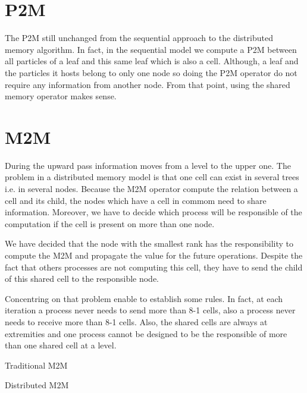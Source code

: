 \documentclass[10pt,letterpaper,titlepage]{report}
\begin{document}
\section{P2M}
The P2M still unchanged from the sequential approach to the distributed memory algorithm.
In fact, in the sequential model we compute a P2M between all particles of a leaf and this same leaf which is also a cell.
Although, a leaf and the particles it hosts belong to only one node so doing the P2M operator do not require any information from another node.
From that point, using the shared memory operator makes sense.


\section{M2M}
During the upward pass information moves from a level to the upper one.
The problem in a distributed memory model is that one cell can exist in several trees i.e. in several nodes.
Because the M2M operator compute the relation between a cell and its child, the nodes which have a cell in commom need to share information.
Moreover, we have to decide which process will be responsible of the computation if the cell is present on more than one node.

We have decided that the node with the smallest rank has the responsibility to compute the M2M and propagate the value for the future operations.
Despite the fact that others processes are not computing this cell, they have to send the child of this shared cell to the responsible node.

Concentring on that problem enable to establish some rules.
In fact, at each iteration a process never needs to send more than 8-1 cells, also a process never needs to receive more than 8-1 cells.
Also, the shared cells are always at extremities and one process cannot be designed to be the responsible of more than one shared cell at a level.


\begin{algorithm}[H]
\SetLine
{}
\BlankLine
{}
\BlankLine
\caption{Traditional M2M}
\end{algorithm}


\begin{algorithm}[H]
\SetLine
{}
\BlankLine
{}
\BlankLine
\caption{Distributed M2M}
\end{algorithm}
\end{document}
